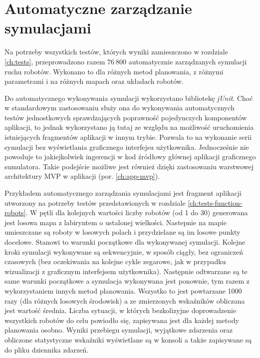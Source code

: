 \section{Automatyczne zarządzanie symulacjami}
Na potrzeby wszystkich testów, których wyniki zamieszczono w rozdziale \ref{ch:tests}, przeprowadzono razem $76\ 800$ automatycznie zarządzanych symulacji ruchu robotów. Wykonano to dla różnych metod planowania, z różnymi parametrami i na różnych mapach oraz układach robotów.

Do automatycznego wykonywania symulacji wykorzystano bibliotekę {\it jUnit}. Choć w standardowym zastosowaniu służy ona do wykonywania automatycznych testów jednostkowych sprawdzających poprawność pojedynczych komponentów aplikacji, to jednak wykorzystano ją tutaj ze względu na możliwość uruchomienia istniejących fragmentów aplikacji w innym trybie.
Pozwala to na wykonanie serii symulacji bez wyświetlania graficznego interfejsu użytkownika.
Jednocześnie nie powoduje to jakiejkolwiek ingerencji w kod źródłowy głównej aplikacji graficznego sumulatora.
Takie podejście możliwe jest również dzięki zastosowaniu warstwowej architektury MVP w aplikacji (por. \ref{ch:app-mvp}).

Przykładem automatycznego zarządzania symulacjami jest fragment aplikacji utworzony na potrzeby testów przedstawionych w rozdziale \ref{ch:tests-function-robots}.
W pętli dla kolejnych wartości liczby robotów (od 1 do 30) generowana jest losowa mapa z labiryntem o ustalonej wielkości.
Nastepnie na mapie umieszczane są roboty w losowych polach i przydzielane są im losowe punkty docelowe.
Stanowi to warunki początkowe dla wykonywanej symulacji. Kolejne kroki symulacji wykonywane są sekwencyjnie, w sposób ciągły, bez ograniczeń czasowych (bez oczekiwania na kolejne cykle zegarowe, jak w przypadku wizualizacji z graficznym interfejsem użytkownika).
Następnie odtwarzane są te same warunki początkowe a symulacja wykonywana jest ponownie, tym razem z wykorzystaniem innych metod planowania.
Wszystko to jest powtarzane 1000 razy (dla różnych losowych środowisk) a ze zmierzonych wskaźników obliczana jest wartość średnia.
Liczba sytuacji, w których bezkolizyjne doprowadzenie wszystkich robotów do celu powiodło się, zapisywana jest dla każdej metody planowania osobno.
Wyniki przebiegu symulacji, wyjątkowe zdarzenia oraz obliczone statystyczne wskaźniki wyświetlane są w konsoli a także zapisywane są do pliku dziennika zdarzeń.

